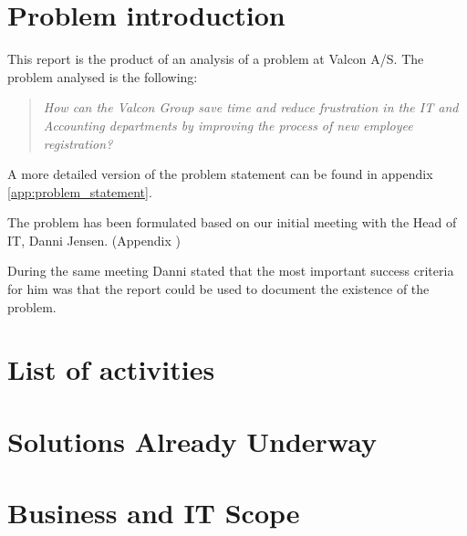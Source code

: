 \section{Problem introduction}
This report is the product of an analysis of a problem at Valcon A/S.
The problem analysed is the following:

\begin{quotation}
\emph{How can the Valcon Group save time and reduce frustration in the IT and Accounting departments by improving the process of new employee registration?}
\end{quotation}

\noindent A more detailed version of the problem statement can be found in appendix \ref{app:problem_statement}.

The problem has been formulated based on our initial meeting with the Head of IT, Danni Jensen. (Appendix )

During the same meeting Danni stated that the most important success criteria for him was that the report could be used to document the existence of the problem.

\section{List of activities}


\section{Solutions Already Underway}


\section{Business and IT Scope}

